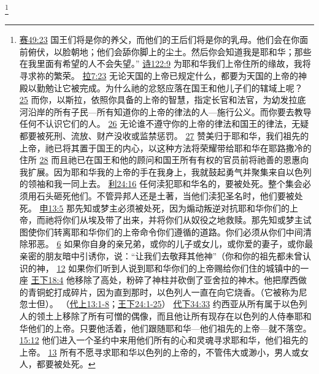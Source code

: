 \documentclass[12pt, a4paper, oneside]{ctexart}
\begin{document}
	\footnote {
		\href{https://biblehub.com/isaiah/49-23.htm}{赛49:23} 国王们将是你的养父，而他们的王后们将是你的乳母。他们会在你面前俯伏，以脸朝地；他们会舔你脚上的尘土。然后你会知道我是耶和华；那些在我里面有希望的人不会失望。”
		\href{https://biblehub.com/psalms/122-9.htm}{诗122:9} 为耶和华我们上帝住所的缘故，我将寻求祢的繁荣。
		\href{https://biblehub.com/ezra/7-23.htm}{拉7:23} 无论天国的上帝已规定什么，都要为天国的上帝的神殿以勤勉让它被完成。为什么祂的忿怒应落在国王和他儿子们的辖域上呢？
		\href{https://biblehub.com/ezra/7-25.htm}{25} 而你，以斯拉，依照你具备的上帝的智慧，指定长官和法官，为幼发拉底河沿岸的所有子民---所有知道你的上帝的律法的人---施行公义。而你要去教导任何不认识它们的人。
		\href{https://biblehub.com/ezra/7-26.htm}{26} 无论谁不遵守你的上帝的律法和国王的律法，无疑都要被死刑、流放、财产没收或监禁惩罚。
		\href{https://biblehub.com/ezra/7-27.htm}{27} 赞美归于耶和华，我们祖先的上帝，祂已将其置于国王的内心，以这种方法将荣耀带给耶和华在耶路撒冷的住所
		\href{https://biblehub.com/ezra/7-28.htm}{28} 而且祂已在国王和他的顾问和国王所有有权的官员前将祂善的恩惠向我扩展。因为耶和华我的上帝的手在我身上，我就鼓起勇气并聚集来自以色列的领袖和我一同上去。
		\href{https://biblehub.com/leviticus/24-16.htm}{利24:16} 任何渎犯耶和华名的，要被处死。整个集会必须用石头砸死他们。不管异邦人还是土著，当他们渎犯圣名时，他们要被处死。
		\href{https://biblehub.com/deuteronomy/13-5.htm}{申13:5} 那先知或梦主必须被处死，因为煽动叛逆对抗耶和华你们的上帝，而祂将你们从埃及带了出来，并将你们从奴役之地救赎。那先知或梦主试图使你们转离耶和华你们的上帝命令你们遵循的道路。你们必须从你们中间清除邪恶。
		\href{https://biblehub.com/deuteronomy/13-6.htm}{6} 如果你自身的亲兄弟，或你的儿子或女儿，或你爱的妻子，或你最亲密的朋友暗中引诱你，说：“让我们去敬拜其他神”（你和你的祖先都未曾认识的神，
		\href{https://biblehub.com/deuteronomy/13-12.htm}{12} 如果你们听到人说到耶和华你们的上帝赐给你们住的城镇中的一座
		\href{https://biblehub.com/2_kings/18-4.htm}{王下18:4} 他移除了高处，粉碎了神柱并砍倒了亚舍拉的神木。他把摩西做的青铜蛇打成碎片，因为直到那时，以色列人一直在向它烧香。（它被称为尼忽士但）。
		（\href{https://biblehub.com/niv/1_chronicles/13.htm}{代上13:1-8}；\href{https://biblehub.com/niv/2_kings/24.htm}{王下24:1-25}） 
		\href{https://biblehub.com/2_chronicles/34-33.htm}{代下34:33} 约西亚从所有属于以色列人的领土上移除了所有可憎的偶像，而且他让所有现存在以色列的人侍奉耶和华他们的上帝。只要他活着，他们跟随耶和华---他们祖先的上帝---就不落空。
		\href{https://biblehub.com/2_chronicles/15-12.htm}{15:12} 他们进入一个圣约中来用他们所有的心和灵魂寻求耶和华，他们祖先的上帝。
		\href{https://biblehub.com/2_chronicles/15-13.htm}{13} 所有不愿寻求耶和华以色列的上帝的，不管伟大或渺小，男人或女人，都要被处死。
	}
\end{document}
